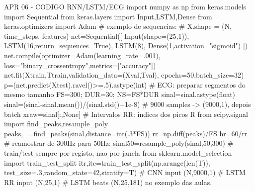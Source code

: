 APR 06 - CODIGO RNN/LSTM/ECG
import numpy as np
from keras.models import Sequential
from keras.layers import Input,LSTM,Dense
from keras.optimizers import Adam
# exemplo de sequencias:
# X.shape = (N, time_steps, features)
net=Sequential([
 Input(shape=(25,1)),
 LSTM(16,return_sequences=True),
 LSTM(8),
 Dense(1,activation="sigmoid")
])
net.compile(optimizer=Adam(learning_rate=.001),
 loss="binary_crossentropy",metrics=["accuracy"])
net.fit(Xtrain,Ttrain,validation_data=(Xval,Tval),
 epochs=50,batch_size=32)
p=(net.predict(Xtest).ravel()>=.5).astype(int)
# ECG: preparar segmentos do mesmo tamanho
FS=300; DUR=30; NS=FS*DUR
sinal=sinal.astype(float)
sinal=(sinal-sinal.mean())/(sinal.std()+1e-8)
# 9000 samples -> (9000,1), depois batch
xraw=sinal[:,None]
# Intervalos RR: indices dos picos R
from scipy.signal import find_peaks,resample_poly
peaks,_=find_peaks(sinal,distance=int(.3*FS))
rr=np.diff(peaks)/FS
hr=60/rr
# reamostrar de 300Hz para 50Hz:
sinal50=resample_poly(sinal,50,300)
# train/test sempre por registo, nao por janela
from sklearn.model_selection import train_test_split
itr,ite=train_test_split(np.arange(len(T)),
 test_size=.3,random_state=42,stratify=T)
# CNN input (N,9000,1)
# LSTM RR input (N,25,1)
# LSTM beats (N,25,181) no exemplo das aulas.